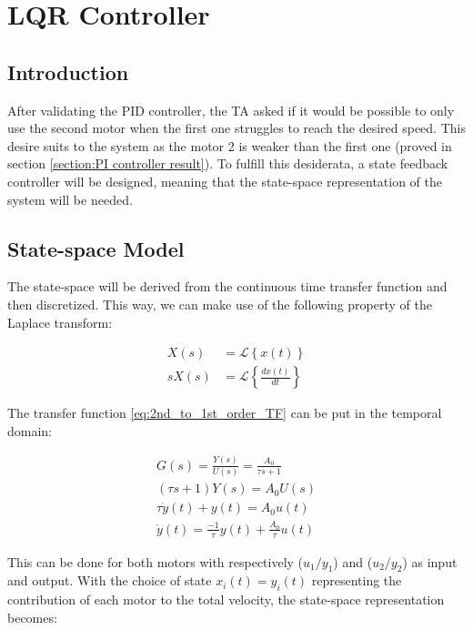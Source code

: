 \chapter{LQR Controller}
\label{section:lqr}

\section{Introduction}
\label{section:lqr introduction}

After validating the PID controller, the TA asked if it would be possible to only use the second motor when the first one struggles to reach the desired speed. This desire suits to the system as the motor 2 is weaker than the first one (proved in section \ref{section:PI controller result}). To fulfill this desiderata, a state feedback controller will be designed, meaning that the state-space representation of the system will be needed.

\section{State-space Model}
\label{section:ss representation}

The state-space will be derived from the continuous time transfer function and then discretized. This way, we can make use of the following property of the Laplace transform:

\begin{align}
    X(s) &= \mathcal{L}\left\{x(t)\right\}\\
    s X(s) &= \mathcal{L}\left\{\frac{d x(t)}{dt}\right\}
\end{align}

The transfer function \ref{eq:2nd_to_1st_order_TF} can be put in the temporal domain:

\begin{gather}
    G(s) = \frac{Y(s)}{U(s)} = \frac{A_0}{\tau s + 1}\\
    \left(\tau s + 1\right) Y(s) = A_0 U(s)\\
    \tau \dot{y}(t) + y(t) = A_0 u(t)\\
    \dot{y}(t) = \frac{-1}{\tau} y(t) + \frac{A_0}{\tau} u(t)
\end{gather}

This can be done for both motors with respectively ($u_1/y_1$) and ($u_2/y_2$) as input and output. With the choice of 
state $x_i(t) = y_i(t)$ representing the contribution of each motor to the total velocity, the state-space 
representation becomes:

